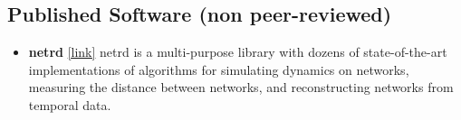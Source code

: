 \documentclass[12pt,]{scrartcl}
\newenvironment{myitemize}
{ \begin{itemize}
    \setlength{\itemsep}{5pt}
    \setlength{\parskip}{0pt}
    \setlength{\parsep}{0pt}     }
{ \end{itemize}                  }
\begin{document}
\subsection{Published Software (non peer-reviewed)}\label{software}
\begin{myitemize}
\leftskip-0.25in

\item \textbf{netrd} \href{https://github.com/netsiphd/netrd}{[link]} netrd is a multi-purpose library with dozens of state-of-the-art implementations of algorithms for simulating dynamics on networks, measuring the distance between networks, and reconstructing networks from temporal data.



\end{myitemize}
\end{document}
